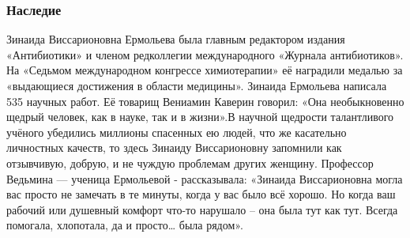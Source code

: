 \subsubsection{Наследие}

Зинаида Виссарионовна Ермольева была главным редактором издания «Антибиотики» и
членом редколлегии международного «Журнала антибиотиков». На «Седьмом
международном конгрессе химиотерапии» её наградили медалью за «выдающиеся
достижения в области медицины». Зинаида Ермольева написала 535 научных работ.
Её товарищ Вениамин Каверин говорил: «Она необыкновенно щедрый человек, как в
науке, так и в жизни».В научной щедрости талантливого учёного убедились
миллионы спасенных ею людей, что же касательно личностных качеств, то здесь
Зинаиду Виссарионовну запомнили как отзывчивую, добрую, и не чуждую проблемам
других женщину. Профессор Ведьмина --- ученица Ермольевой - рассказывала:
«Зинаида Виссарионовна могла вас просто не замечать в те минуты, когда у вас
было всё хорошо. Но когда ваш рабочий или душевный комфорт что-то нарушало –
она была тут как тут. Всегда помогала, хлопотала, да и просто… была рядом».

